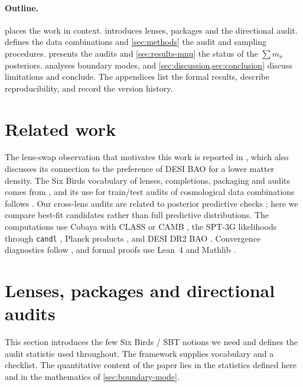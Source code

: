 \documentclass[11pt]{article}
\theoremstyle{remark}
\newcommand{\mnu}{\sum m_\nu}
\numberwithin{equation}{section}
\begin{document}
\paragraph{Outline.}
 places the work in context.  introduces lenses, packages and the directional audit.  defines the data combinations and \cref{sec:methods} the audit and sampling procedures.  presents the audits and \cref{sec:results-mnu} the status of the $\mnu$ posteriors.  analyses boundary modes, and \cref{sec:discussion,sec:conclusion} discuss limitations and conclude. The appendices list the formal results, describe reproducibility, and record the version history.
 \section{Related work}
\label{sec:related-work}

The lens-swap observation that motivates this work is reported in \cite{arxiv2601_16277}, which also discusses its connection to the preference of DESI BAO for a lower matter density. The Six Birds vocabulary of lenses, completions, packaging and audits comes from \cite{sixbirds_foundations}, and its use for train/test audits of cosmological data combinations follows \cite{sixbirds_darkenergy}. Our cross-lens audits are related to posterior predictive checks \cite{gelman_meng_stern1996_ppc}; here we compare best-fit candidates rather than full predictive distributions. The computations use Cobaya \cite{cobaya} with CLASS \cite{class} or CAMB \cite{camb}, the SPT-3G likelihoods through \texttt{candl} \cite{candl,spt3g2018_ttteee,spt3g_d1}, Planck products \cite{planck2018_cosmoparams,planck2018_likelihood,planck_pr4_lensing}, and DESI DR2 BAO \cite{desi_dr2_bao_docs,bao_data_v26,desi_dr2_results_ii_bao}. Convergence diagnostics follow \cite{gelman_rubin1992,vehtari2021_rhat}, and formal proofs use Lean~4 and Mathlib \cite{lean4,mathlib}.
 \section{Lenses, packages and directional audits}
\label{sec:sbt-framework}

This section introduces the few Six Birds / SBT notions we need \cite{sixbirds_foundations,sixbirds_darkenergy} and defines the audit statistic used throughout. The framework supplies vocabulary and a checklist. The quantitative content of the paper lies in the statistics defined here and in the mathematics of \cref{sec:boundary-mode}.
\end{document}
